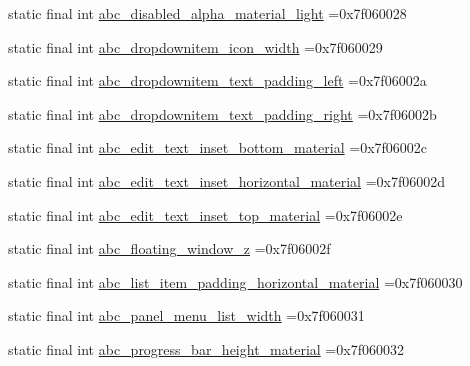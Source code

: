 \begin{DoxyCompactItemize}
\item 
static final int \mbox{\hyperlink{classcom_1_1example_1_1trainawearapplication_1_1_r_1_1dimen_a82a272eb94bc02a8ddabb1ac8caf0f72}{abc\+\_\+disabled\+\_\+alpha\+\_\+material\+\_\+light}} =0x7f060028
\item 
static final int \mbox{\hyperlink{classcom_1_1example_1_1trainawearapplication_1_1_r_1_1dimen_aa9fe8428c7d55b970862d5d939cb600e}{abc\+\_\+dropdownitem\+\_\+icon\+\_\+width}} =0x7f060029
\item 
static final int \mbox{\hyperlink{classcom_1_1example_1_1trainawearapplication_1_1_r_1_1dimen_a82a3743e9307092ce872278477132e0e}{abc\+\_\+dropdownitem\+\_\+text\+\_\+padding\+\_\+left}} =0x7f06002a
\item 
static final int \mbox{\hyperlink{classcom_1_1example_1_1trainawearapplication_1_1_r_1_1dimen_afc1056ec322c8f96c9925a5c87f91db1}{abc\+\_\+dropdownitem\+\_\+text\+\_\+padding\+\_\+right}} =0x7f06002b
\item 
static final int \mbox{\hyperlink{classcom_1_1example_1_1trainawearapplication_1_1_r_1_1dimen_af1ad3eeb4d4a4b00cbd45fcf04db4bab}{abc\+\_\+edit\+\_\+text\+\_\+inset\+\_\+bottom\+\_\+material}} =0x7f06002c
\item 
static final int \mbox{\hyperlink{classcom_1_1example_1_1trainawearapplication_1_1_r_1_1dimen_a416a14fe5fcea310562aadf70ebf919c}{abc\+\_\+edit\+\_\+text\+\_\+inset\+\_\+horizontal\+\_\+material}} =0x7f06002d
\item 
static final int \mbox{\hyperlink{classcom_1_1example_1_1trainawearapplication_1_1_r_1_1dimen_a6a504fbe2391923b57e1690b9f1c5ae2}{abc\+\_\+edit\+\_\+text\+\_\+inset\+\_\+top\+\_\+material}} =0x7f06002e
\item 
static final int \mbox{\hyperlink{classcom_1_1example_1_1trainawearapplication_1_1_r_1_1dimen_a7a57f9a29815f133150db6e8012164fc}{abc\+\_\+floating\+\_\+window\+\_\+z}} =0x7f06002f
\item 
static final int \mbox{\hyperlink{classcom_1_1example_1_1trainawearapplication_1_1_r_1_1dimen_ad72cc37658639d5ae410bfed80cdbd6d}{abc\+\_\+list\+\_\+item\+\_\+padding\+\_\+horizontal\+\_\+material}} =0x7f060030
\item 
static final int \mbox{\hyperlink{classcom_1_1example_1_1trainawearapplication_1_1_r_1_1dimen_a72fc17856530eb2d9bbc0ca72f88c197}{abc\+\_\+panel\+\_\+menu\+\_\+list\+\_\+width}} =0x7f060031
\item 
static final int \mbox{\hyperlink{classcom_1_1example_1_1trainawearapplication_1_1_r_1_1dimen_a3e294fe65b20e0fb66952b115c947cbf}{abc\+\_\+progress\+\_\+bar\+\_\+height\+\_\+material}} =0x7f060032

\end{DoxyCompactItemize}
